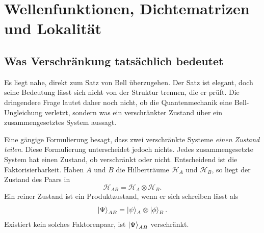 \chapter{Wellenfunktionen, Dichtematrizen und Lokalität}


\section{Was Verschränkung tatsächlich bedeutet}

Es liegt nahe, direkt zum Satz von Bell überzugehen. Der Satz ist elegant, doch seine Bedeutung lässt sich nicht von der Struktur trennen, die er prüft. Die dringendere Frage lautet daher noch nicht, ob die Quantenmechanik eine Bell-Ungleichung verletzt, sondern was ein verschränkter Zustand über ein zusammengesetztes System aussagt.

Eine gängige Formulierung besagt, dass zwei verschränkte Systeme \emph{einen Zustand teilen}. Diese Formulierung unterscheidet jedoch nichts. Jedes zusammengesetzte System hat einen Zustand, ob verschränkt oder nicht. Entscheidend ist die Faktorisierbarkeit. Haben \(A\) und \(B\) die Hilberträume \(\mathcal H_A\) und \(\mathcal H_B\), so liegt der Zustand des Paars in
\begin{equation}
\mathcal H_{AB}=\mathcal H_A\otimes\mathcal H_B.
\end{equation}
Ein reiner Zustand ist ein Produktzustand, wenn er sich schreiben lässt als
\begin{equation}
\left\lvert\Psi\right\rangle_{AB}=\left\lvert\psi\right\rangle_A\otimes\left\lvert\phi\right\rangle_B.
\label{eq:l7-product-state}
\end{equation}
Existiert kein solches Faktorenpaar, ist \(\left\lvert\Psi\right\rangle_{AB}\) verschränkt.

